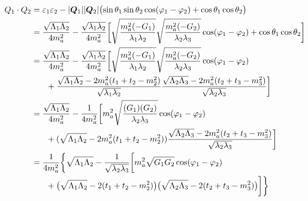 \begin{gather}
    \begin{aligned}
        Q_1 \cdot Q_2 
            &= 
            \varepsilon_1 \varepsilon_2
                - |\bm{Q}_{1}| |\bm{Q}_{2}| 
                \bigl(
                    \sin \theta_1 \sin \theta_2 \cos(\varphi_1 - \varphi_2) + \cos \theta_1 \cos \theta_2
                \bigr) \\
            &=
            \frac{\sqrt{\Lambda_1 \Lambda_2}}{4 m_a^2}
            - \frac{\sqrt{\lambda_1 \lambda_2}}{4 m_a^2}
            \bigg[
                \sqrt{\frac{m_a^2 (-G_{1})}{\lambda_{1} \lambda_{2}}}
                \sqrt{\frac{m_a^2 (-G_{2})}{\lambda_{2} \lambda_{3}}}
                \cos(\varphi_1 - \varphi_2)
                + \cos\theta_1 \cos\theta_2
            \bigg] \\
            &=
            \frac{\sqrt{\Lambda_1 \Lambda_2}}{4 m_a^2}
            - \frac{\sqrt{\lambda_1 \lambda_2}}{4 m_a^2}
            \bigg[
                \sqrt{\frac{m_a^2 (-G_{1})}{\lambda_{1} \lambda_{2}}}
                \sqrt{\frac{m_a^2 (-G_{2})}{\lambda_{2} \lambda_{3}}}
                \cos(\varphi_1 - \varphi_2) \\
                & \hphantom{=\quad} + \frac{\sqrt{\Lambda_{1} \Lambda_{2}} - 2 m_a^2 (t_{1} + t_{2} - m_{2}^2)}{\sqrt{\lambda_{1}\lambda_{2}}} \frac{\sqrt{\Lambda_{2} \Lambda_{3}} - 2 m_a^2 (t_{2} + t_{3} - m_{3}^2)}{\sqrt{\lambda_{2}\lambda_{3}}}
            \bigg] \\
            &=
            \frac{\sqrt{\Lambda_1 \Lambda_2}}{4 m_a^2}
            - \frac{1}{4 m_a^2}
            \bigg[
                m_a^2 \sqrt{\frac{(G_1)(G_2)}{\lambda_2 \lambda_3}}
                \cos(\varphi_1 - \varphi_2) \\
                & \hphantom{=\quad} +
                (\sqrt{\Lambda_1 \Lambda_2} - 2 m_a^2 (t_1 + t_2 - m_2^2)) 
                \frac{\sqrt{\Lambda_{2} \Lambda_{3}} - 2 m_a^2 (t_{2} + t_{3} - m_{3}^2)}{\sqrt{\lambda_{2}\lambda_{3}}}
            \bigg] \\
            &= 
            \frac{1}{4 m_a^2}
            \bigg \{
                \sqrt{\Lambda_1 \Lambda_2}
                - 
                \frac{1}{\sqrt{\lambda_2 \lambda_3}}
                \bigg[
                    m_a^2 \sqrt{G_1 G_2} \cos (\varphi_1 - \varphi_2) \\
                    &\hphantom{= \quad} 
                    + 
                    \big(\sqrt{\Lambda_1 \Lambda_2} - 2 (t_1 + t_2 - m_2^2)\big)
                    \big(\sqrt{\Lambda_2 \Lambda_3} - 2 (t_2 + t_3 - m_3^2)\big)
                \bigg]
            \bigg \}
    \end{aligned}
\end{gather}
